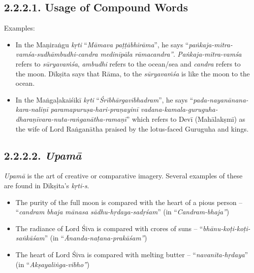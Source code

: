\subsection*{2.2.2.1. Usage of Compound Words}

Examples:

\begin{itemize}

 \item In the Maṇiraṅgu \textit{kṛti} “\textit{Māmava paṭṭābhirāma}”, he says “\textit{paṅkaja-mitra-vamśa-sudhāmbudhi-candra medinīpāla rāmacandra”}. \textit{Paṅkaja-mitra-vamśa} refers to \textit{sūryavaṁśa}, \textit{ambudhi} refers to the ocean/sea and \textit{ candra} refers to the moon. Dīkṣita says that Rāma, to the \textit{sūryavaṁśa} is like the moon to the ocean.

 \item In the Maṅgaḷakaiśikī \textit{kṛti} “\textit{Śrībhārgavībhadram}”, he says “\textit{pada-nayanānana-kara-naliṇī paramapuruṣa-hari-praṇayinī vadana-kamala-guruguha-dharaṇīvara-nuta-raṅganātha-ramaṇī}” which refers to Devī (Mahālakṣmī) as the wife of Lord Raṅganātha praised by the lotus-faced Guruguha and kings.

\end{itemize}


\subsection*{2.2.2.2. \textit{Upamā}}

\textit{Upamā} is the art of creative or comparative imagery. Several examples of these are found in Dīkṣita’s \textit{kṛti-s}.

\begin{itemize}
\itemsep=0pt

 \item The purity of the full moon is compared with the heart of a pious person – “\textit{candram bhaja mānasa sādhu-hṛdaya-sadṛśam}” (in “\textit{Candram-bhaja”})

 \item The radiance of Lord Śiva is compared with crores of suns – “\textit{bhānu-koṭi-koṭi-saṅkāśam}” (in “\textit{Ānanda-naṭana-prakāśam”})

 \item The heart of Lord Śiva is compared with melting butter – “\textit{navanīta-hṛdaya}” (in “\textit{Akṣayaliṅga-vibho”})

\end{itemize}

